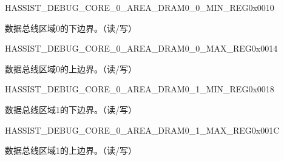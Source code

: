 \begin{register}{H}{ASSIST\_DEBUG\_CORE\_0\_AREA\_DRAM0\_0\_MIN\_REG}{0x0010}\label{regdesc:ASSISTDEBUGCORE0AREADRAM00MINREG}
%
\regnewline%
\begin{regdesc}\begin{reglist}
\label{fielddesc:ASSISTDEBUGCORE0AREADRAM00MIN}\item [ASSIST\_DEBUG\_CORE\_0\_AREA\_DRAM0\_0\_MIN] 数据总线区域0的下边界。（读/写）
\end{reglist}\end{regdesc}
\end{register}


\begin{register}{H}{ASSIST\_DEBUG\_CORE\_0\_AREA\_DRAM0\_0\_MAX\_REG}{0x0014}\label{regdesc:ASSISTDEBUGCORE0AREADRAM00MAXREG}
%
\regnewline%
\begin{regdesc}\begin{reglist}
\label{fielddesc:ASSISTDEBUGCORE0AREADRAM00MAX}\item [ASSIST\_DEBUG\_CORE\_0\_AREA\_DRAM0\_0\_MAX] 数据总线区域0的上边界。（读/写）
\end{reglist}\end{regdesc}
\end{register}


\begin{register}{H}{ASSIST\_DEBUG\_CORE\_0\_AREA\_DRAM0\_1\_MIN\_REG}{0x0018}\label{regdesc:ASSISTDEBUGCORE0AREADRAM01MINREG}
%
\regnewline%
\begin{regdesc}\begin{reglist}
\label{fielddesc:ASSISTDEBUGCORE0AREADRAM01MIN}\item [ASSIST\_DEBUG\_CORE\_0\_AREA\_DRAM0\_1\_MIN] 数据总线区域1的下边界。（读/写）
\end{reglist}\end{regdesc}
\end{register}


\begin{register}{H}{ASSIST\_DEBUG\_CORE\_0\_AREA\_DRAM0\_1\_MAX\_REG}{0x001C}\label{regdesc:ASSISTDEBUGCORE0AREADRAM01MAXREG}
%
\regnewline%
\begin{regdesc}\begin{reglist}
\label{fielddesc:ASSISTDEBUGCORE0AREADRAM01MAX}\item [ASSIST\_DEBUG\_CORE\_0\_AREA\_DRAM0\_1\_MAX] 数据总线区域1的上边界。（读/写）
\end{reglist}\end{regdesc}
\end{register}


